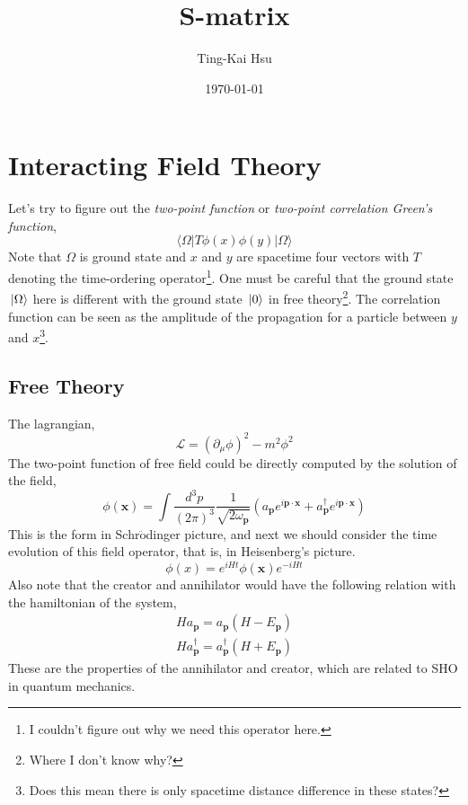 \documentclass[12pt]{article}
\title{S-matrix}
\author{Ting-Kai Hsu}
\date{\today}
\numberwithin{equation}{section}
\begin{document}
\maketitle
\tableofcontents
\section{Interacting Field Theory}
Let's try to figure out the \textit{two-point function} or \textit{two-point correlation Green's function},
\begin{equation}
    \langle\Omega|T\phi(x)\phi(y)|\Omega\rangle
\end{equation}
Note that $\Omega$ is ground state and $x$ and $y$ are spacetime four vectors with $T$ denoting the time-ordering operator\footnote{I couldn't figure out why we need this operator here.}.
One must be careful that the ground state $\ket*{\Omega}$ here is different with the ground state $\ket*{0}$ in free theory\footnote{Where I don't know why?}.
The correlation function can be seen as the amplitude of the propagation for a particle between $y$ and $x$\footnote{Does this mean there is only spacetime distance difference in these states?}.
\subsection{Free Theory}
The lagrangian,
\begin{equation}
    \mathcal{L} = (\partial_{\mu}\phi)^2 - m^{2}\phi^2
\end{equation}
The two-point function of free field could be directly computed by the solution of the field,
\begin{equation}
    \phi(\mathbf{x}) = \int{\frac{d^3p}{(2\pi)^3}\frac{1}{\sqrt{2\omega_{\mathbf{p}}}}\left(a_{\mathbf{p}}e^{i\mathbf{p}\cdot\mathbf{x}} + a^{\dagger}_{\mathbf{p}}e^{i\mathbf{p}\cdot\mathbf{x}}\right)}
\end{equation}
This is the form in Schr$\ddot{\text{o}}$dinger picture, and next we should consider the time evolution of this field operator, that is, in Heisenberg's picture.
\begin{equation}
    \phi(x) = e^{iHt}\phi(\mathbf{x})e^{-iHt}
\end{equation}
Also note that the creator and annihilator would have the following relation with the hamiltonian of the system,
\begin{equation}
    \begin{split}
        Ha_{\mathbf{p}} = a_{\mathbf{p}}\left(H-E_{\mathbf{p}}\right)\\
        Ha_{\mathbf{p}}^{\dagger} = a_{\mathbf{p}}^{\dagger}\left(H+E_{\mathbf{p}}\right)
    \end{split}
\end{equation}
These are the properties of the annihilator and creator, which are related to SHO in quantum mechanics.
\end{document}
